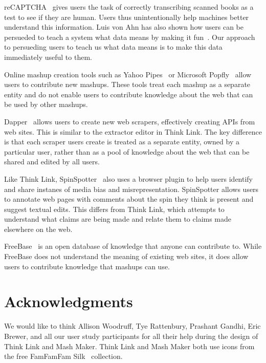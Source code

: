 \documentclass{chi2009}
\begin{document}
reCAPTCHA~\cite{recaptcha} gives users the task of correctly transcribing scanned books as a test to see if they are human. Users thus unintentionally help machines better understand this information. Luis von Ahn has also shown how users can be persueded to teach a system what data means by making it fun~\cite{vonahn}. Our approach to persueding users to teach us what data means is to make this data immediately useful to them.

Online mashup creation tools such as Yahoo Pipes~\cite{pipes} or Microsoft Popfly~\cite{popfly} allow users to contribute new mashups. These tools treat each mashup as a separate entity and do not enable users to contribute knowledge about the web that can be used by other mashups.

Dapper~\cite{dapper} allows users to create new web scrapers, effectively creating APIs from web sites. This is similar to the extractor editor in Think Link. The key difference is that each scraper users create is treated as a separate entity, owned by a particular user, rather than as a pool of knowledge about the web that can be shared and edited by all users.

Like Think Link, SpinSpotter~\cite{spinspotter} also uses a browser plugin to help users identify and share instanes of media bias and misrepresentation. SpinSpotter allows users to annotate web pages with comments about the spin they think is present and suggest textual edits. This differs from Think Link, which attempts to understand what claims are being made and relate them to claims made elsewhere on the web.

FreeBase~\cite{freebase} is an open database of knowledge that anyone can contribute to. While FreeBase does not understand the meaning of existing web sites, it does allow users to contribute knowledge that mashups can use.



\section{Acknowledgments}

We would like to think Allison Woodruff, Tye Rattenbury, Prashant Gandhi, Eric Brewer, and all our user study participants for all their help during the design of Think Link and Mash Maker. Think Link and Mash Maker both use icons from the free FamFamFam Silk~\cite{silkicons} collection.



\end{document}

